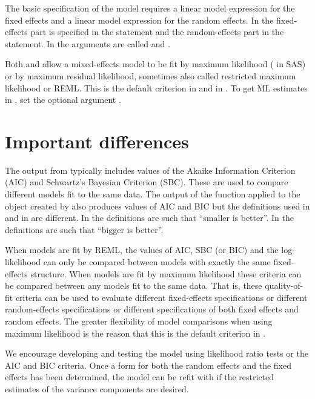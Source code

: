 \documentclass[12pt]{article}
\begin{document}
The basic specification of the model requires a linear model
expression for the fixed effects and a linear model expression for the 
random effects.  In  the fixed-effects part is
specified in the  statement and the random-effects
part in the  statement.  In  the
arguments are called  and .

Both  and  allow a mixed-effects model
to be fit by maximum likelihood ( in SAS) or by
maximum residual likelihood, sometimes also called restricted maximum
likelihood or \textsf{REML}.  This is the default criterion in
 and in .  To get \textsf{ML}
estimates in , set the optional argument
.

\section{Important differences}
\label{sec:differences}

The output from  typically includes values of the
Akaike Information Criterion (\textsf{AIC}) and Schwartz's Bayesian
Criterion (\textsf{SBC}).  These are used to compare different models
fit to the same data.  The output of the  function applied
to the object created by  also produces values of \textsf{AIC}
and \textsf{BIC} but the definitions used in  and in
 are different.  In  the definitions are such that
``smaller is better''.  In  the definitions are such
that ``bigger is better''.

When models are fit by \textsf{REML}, the values of \textsf{AIC},
\textsf{SBC} (or \textsf{BIC}) and the log-likelihood can only be
compared between models with exactly the same fixed-effects structure.
When models are fit by maximum likelihood these criteria can be
compared between any models fit to the same data.  That is, these
quality-of-fit criteria can be used to evaluate different
fixed-effects specifications or different random-effects
specifications or different specifications of both fixed effects and
random effects.  The greater flexibility of model comparisons when
using maximum likelihood is the reason that this is the default
criterion in .

We encourage developing and testing the model using likelihood ratio
tests or the \textsf{AIC} and \textsf{BIC} criteria.  Once a form
for both the random effects and the fixed effects has been determined,
the model can be refit with  if the restricted
estimates of the variance components are desired.
\end{document}
